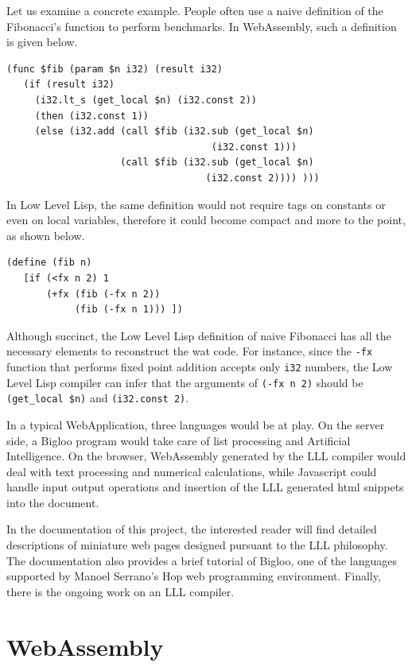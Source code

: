 \documentclass[a4paper,12pt]{book}
\begin{document}
Let us examine a concrete example. People often use a naive
definition of the Fibonacci's function to perform benchmarks.
In WebAssembly, such a definition is given below.

\begin{verbatim}
(func $fib (param $n i32) (result i32)
   (if (result i32)
     (i32.lt_s (get_local $n) (i32.const 2))
     (then (i32.const 1)) 
     (else (i32.add (call $fib (i32.sub (get_local $n)
                                    (i32.const 1)))
                    (call $fib (i32.sub (get_local $n) 
                                   (i32.const 2)))) )))
\end{verbatim}

In Low Level Lisp, the same definition would not require
tags on constants or even on local variables, therefore it
could become compact and more to the point, as shown below.


\begin{verbatim}
(define (fib n)
   [if (<fx n 2) 1
       (+fx (fib (-fx n 2))
            (fib (-fx n 1))) ])
\end{verbatim}

Although succinct, the Low Level Lisp definition
of naive Fibonacci has all the necessary elements
to reconstruct the wat code. For instance, since
the \verb|-fx| function that performs fixed point
addition accepts only \verb|i32| numbers, the Low
Level Lisp compiler can infer that the arguments
of \verb|(-fx n 2)| should be \verb|(get_local $n)|
and \verb|(i32.const 2)|.

In a typical WebApplication, three languages would be
at play. On the server side, a Bigloo program would
take care of list processing and Artificial
Intelligence. On the browser, WebAssembly generated
by the LLL compiler would deal with text processing
and numerical calculations, while Javascript could
handle input output operations and insertion of
the LLL generated html snippets into the document.

In the documentation of this project, the interested
reader will find detailed descriptions of miniature
web pages designed pursuant to the LLL philosophy.
The documentation also provides a brief
tutorial of Bigloo, one of the languages supported
by Manoel Serrano's Hop web programming environment.
Finally, there is the ongoing work on an LLL compiler.


\chapter{WebAssembly}
\end{document}
